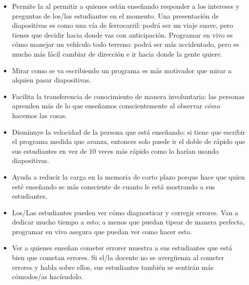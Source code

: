 \begin{itemize}

\item
  Permite la 
  al permitir a quienes están enseñando responder a los intereses y preguntas de los/las estudiantes en el momento.
  Una presentación de diapositivas es como una vía de ferrocarril:
  podrá ser un viaje suave,
  pero tienes que decidir hacia donde vas con anticipación.
  Programar en vivo es cómo manejar un vehículo todo terreno:
  podrá ser más accidentado,
  pero es mucho más fácil cambiar de dirección e ir hacia donde la gente quiere.

\item
  Mirar como se va escribiendo un programa es más motivador
  que mirar a alquien pasar diapositivas.

\item
  Facilita la transferencia de conocimiento de manera involuntaria:
  las personas aprenden más de lo que enseñamos conscientemente
  al observar \emph{cómo} hacemos las cosas.

\item
  Disminuye la velocidad de la persona que está enseñando:
  si tiene que escribir el programa medida que avanza,
  entonces solo puede ir el doble de rápido que sus estudiantes
  en vez de 10 veces más rápido como lo harían usando diapositivas.

\item
  Ayuda a reducir la carga en la memoria de corto plazo
  porque hace que quien esté enseñando se más consciente de cuanto 
  le está mostrando a sus estudiantes.

\item
  Los/Las estudiantes pueden ver cómo diagnosticar y corregir errores.
  Van a dedicar mucho tiempo a esto;
  a menos que puedan tipear de manera perfecta,
  programar en vivo asegura que puedan ver como hacer esto.

\item
  Ver a quienes enseñan cometer errorer muestra a sus estudiantes que está bien que cometan errores.
  Si el/la docente no se avergüenza al cometer errores y habla sobre ellos,
  sus estudiantes también se sentirán más cómodos/as hacíendolo.

\end{itemize}

